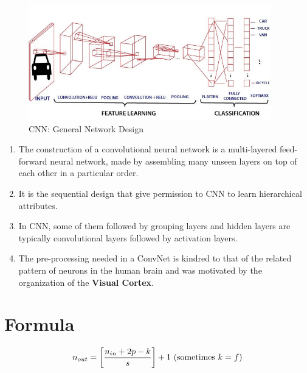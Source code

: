 \begin{figure}[h]
    \centering
    \includegraphics[width=\linewidth, height=5cm, keepaspectratio]{Pictures/convolutional-neural-network/convolutional-neural-network.jpg}
    \caption{CNN: General Network Design}
\end{figure}

\begin{enumerate}
    \item The construction of a convolutional neural network is a multi-layered feed-forward neural network, made by assembling many unseen layers on top of each other in a particular order.

    \item It is the sequential design that give permission to CNN to learn hierarchical attributes.
    
    \item In CNN, some of them followed by grouping layers and hidden layers are typically convolutional layers followed by activation layers.
    
    \item The pre-processing needed in a ConvNet is kindred to that of the related pattern of neurons in the human brain and was motivated by the organization of the \textbf{Visual Cortex}.
\end{enumerate}


\section{Formula}
\[
   \displaystyle n_{out} = \left[ \dfrac{n_{in} + 2p - k}{s} \right] + 1
   \hfill
   \text{ (sometimes $k=f$)}
\]

